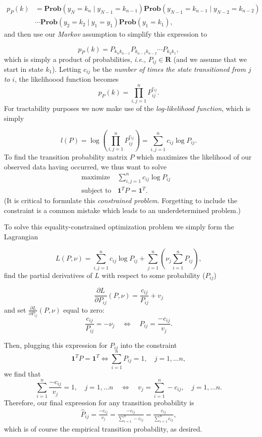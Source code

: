 \documentclass[12pt,reqno]{article}
\theoremstyle{definition}
\numberwithin{equation}{section}
\begin{document}
\[ \begin{aligned}
    p_{P}(k) &= \mathbf{Prob}\left(y_{N} = k_n \mid y_{N-1} = k_{n-1}\right) \mathbf{Prob}\left(y_{N-1}=k_{n-1} \mid y_{N-2} = k_{n-2} \right)\\
&\cdots \mathbf{Prob}(y_{2} = k_{2} \mid y_{1} = y_{1}) \mathbf{Prob}\left(y_1 = k_1\right),
\end{aligned} \]
and then use our \textit{Markov} assumption to simplify this expression to

\[p_{P}(k) = P_{k_{n}k_{n-1}}P_{k_{n-1}k_{n-2}} \cdots P_{k_{2}k_{1}},\]
which is simply a product of probabilities, \textit{i.e.}, $P_{ij} \in \mathbf{R}$ (and we assume
that we start in state $k_1$). Letting $c_{ij}$ be the \textit{number of times the state transitioned
from $j$ to $i$}, the likelihoood function becomes
\[p_{P}(k) = \prod_{i, j=1}^{n}P_{ij}^{c_{ij}}.\]
For tractability purposes we now make use of the \textit{log-likelihood function}, which is simply

\[l(P) = \log \left( \prod_{i, j=1}^{n}P_{ij}^{c_{ij}} \right) = \sum_{i, j=1}^{n} c_{ij}\log P_{ij}.\]
To find the transition probability matrix $P$ which maximizes the likelihood of our observed data having occurred,
we thus want to solve
\[\begin{array}{lll}
\text{maximize} \; & \sum_{i, j=1}^{n} c_{ij}\log P_{ij} & \\
\text{subject to} & \bm{1}^T P = \bm{1}^T.
\end{array}\]
(It is critical to formulate this \textit{constrained problem}. Forgetting to include the constraint
is a common mistake which leads to an underdetermined problem.)

\noindent To solve this equality-constrained optimization problem we simply form the Lagrangian

\[L(P, \nu) = \sum_{i, j=1}^{n} c_{ij}\log P_{ij} + \sum_{j=1}^{n} \left(\nu_j \sum_{i=1}^{n}P_{ij} \right),\]
find the partial derivatives of $L$ with respect to some probability ($P_{ij}$)

\[\frac{\partial L}{\partial P_{ij}}(P, \nu) = \frac{c_{ij}}{P_{ij}} + v_{j}\]
and set $\frac{\partial L}{\partial P_{ij}}(P, \nu)$ equal to zero:
\[\frac{c_{ij}}{P_{ij}} = - \nu_j \quad \Longleftrightarrow \quad P_{ij} = \frac{-c_{ij}}{v_{j}}.\]

\noindent Then, plugging this expression for $P_{ij}$ into the constraint 
\[\bm{1}^T P = \bm{1}^T \Longleftrightarrow \sum_{i=1}^{n}P_{ij}=1, \quad j = 1, \ldots n,\]
we find that
\[\sum_{i=1}^{n}\frac{-c_{ij}}{v_{j}} = 1, \quad j= 1, \ldots n \quad \Longleftrightarrow \quad v_j = \sum_{i=1}^{n}-c_{ij}, \quad j = 1, \ldots n.\]
Therefore, our final expression for any transition probability is
\[\begin{aligned}
    \hat{P}_{ij} = \frac{-c_{ij}}{v_{j}} = \frac{-c_{ij}}{\sum_{i=1}^{n}-c_{ij}} = \frac{c_{ij}}{\sum_{i=1}^{n}c_{ij}},
\end{aligned}\]
which is of course the empirical transition probability, as desired.
\end{document}
